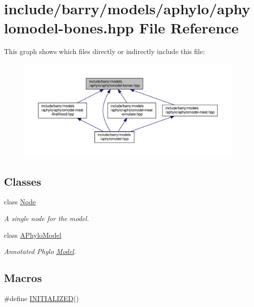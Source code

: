 \hypertarget{aphylomodel-bones_8hpp}{}\section{include/barry/models/aphylo/aphylomodel-\/bones.hpp File Reference}
\label{aphylomodel-bones_8hpp}
This graph shows which files directly or indirectly include this file\+:\nopagebreak
\begin{figure}[H]
\begin{center}
\leavevmode
\includegraphics[width=350pt]{aphylomodel-bones_8hpp__dep__incl}
\end{center}
\end{figure}
\subsection*{Classes}
\begin{DoxyCompactItemize}
\item 
class \hyperlink{class_node}{Node}
\begin{DoxyCompactList}\small\item\em A single node for the model. \end{DoxyCompactList}\item 
class \hyperlink{class_a_phylo_model}{A\+Phylo\+Model}
\begin{DoxyCompactList}\small\item\em Annotated Phylo \hyperlink{class_model}{Model}. \end{DoxyCompactList}\end{DoxyCompactItemize}
\subsection*{Macros}
\begin{DoxyCompactItemize}
\item 
\#define \hyperlink{aphylomodel-bones_8hpp_a08888c91f4cab1da64c8f8bf10b59c40}{I\+N\+I\+T\+I\+A\+L\+I\+Z\+ED}()
\end{DoxyCompactItemize}

